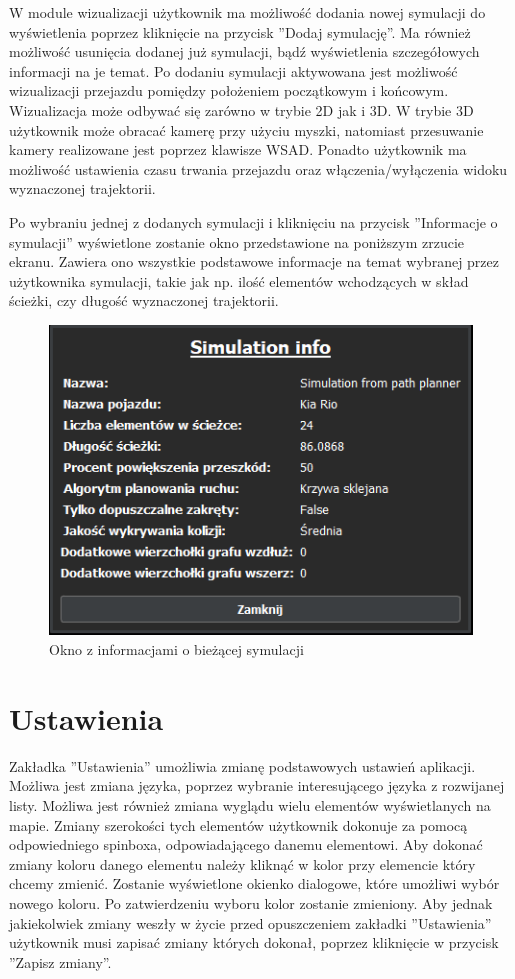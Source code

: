\documentclass[a4paper,11pt,twoside]{report}
\theoremstyle{definition}
\begin{document}
W module wizualizacji użytkownik ma możliwość dodania nowej symulacji do wyświetlenia poprzez kliknięcie na przycisk ''Dodaj symulację''. Ma również możliwość usunięcia dodanej już symulacji, bądź wyświetlenia szczegółowych informacji na je temat. Po dodaniu symulacji aktywowana jest możliwość wizualizacji przejazdu pomiędzy położeniem początkowym i końcowym. Wizualizacja może odbywać się zarówno w trybie 2D jak i 3D. W trybie 3D użytkownik może obracać kamerę przy użyciu myszki, natomiast przesuwanie kamery realizowane jest poprzez klawisze WSAD. Ponadto użytkownik ma możliwość ustawienia czasu trwania przejazdu oraz włączenia/wyłączenia widoku wyznaczonej trajektorii.

Po wybraniu jednej z dodanych symulacji i kliknięciu na przycisk ''Informacje o symulacji'' wyświetlone zostanie okno przedstawione na poniższym zrzucie ekranu. Zawiera ono wszystkie podstawowe informacje na temat wybranej przez użytkownika symulacji, takie jak np. ilość elementów wchodzących w skład ścieżki, czy długość wyznaczonej trajektorii.

\begin{figure}[h!]
\centering
\includegraphics[scale=1.0]{instructionSimulationInfo}
\caption[Okno z informacjami o bieżącej symulacji]{Okno z informacjami o bieżącej symulacji}
\end{figure}

\section{Ustawienia}

Zakładka ''Ustawienia'' umożliwia zmianę podstawowych ustawień aplikacji. Możliwa jest zmiana języka, poprzez wybranie interesującego języka z rozwijanej listy. Możliwa jest również zmiana wyglądu wielu elementów wyświetlanych na mapie. Zmiany szerokości tych elementów użytkownik dokonuje za pomocą odpowiedniego spinboxa, odpowiadającego danemu elementowi. Aby dokonać zmiany koloru danego elementu należy kliknąć w kolor przy elemencie który chcemy zmienić. Zostanie wyświetlone okienko dialogowe, które umożliwi wybór nowego koloru. Po zatwierdzeniu wyboru kolor zostanie zmieniony. Aby jednak jakiekolwiek zmiany weszły w życie przed opuszczeniem zakładki ''Ustawienia'' użytkownik musi zapisać zmiany których dokonał, poprzez kliknięcie w przycisk ''Zapisz zmiany''. 
\end{document}
